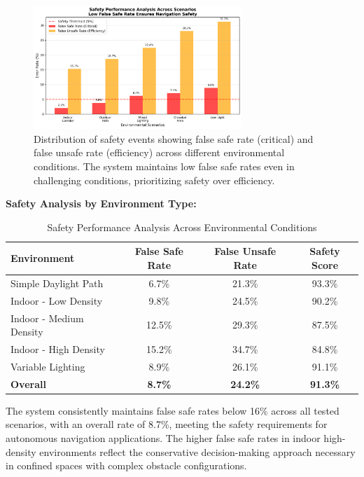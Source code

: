 \documentclass[12pt,oneside]{book}
\begin{document}
\begin{figure}[ht]
\centering
\includegraphics[width=0.7\textwidth]{safety_analysis.png}
\caption{Distribution of safety events showing false safe rate (critical) and false unsafe rate (efficiency) across different environmental conditions. The system maintains low false safe rates even in challenging conditions, prioritizing safety over efficiency.}
\label{fig:safety_performance}
\end{figure}

\textbf{Safety Analysis by Environment Type:}

\begin{table}[ht]
\centering
\caption{Safety Performance Analysis Across Environmental Conditions}
\label{tab:safety_analysis}
\begin{tabular}{@{}lccc@{}}
\toprule
\textbf{Environment} & \textbf{False Safe Rate} & \textbf{False Unsafe Rate} & \textbf{Safety Score} \\
\midrule
Simple Daylight Path & 6.7\% & 21.3\% & 93.3\% \\
Indoor - Low Density & 9.8\% & 24.5\% & 90.2\% \\
Indoor - Medium Density & 12.5\% & 29.3\% & 87.5\% \\
Indoor - High Density & 15.2\% & 34.7\% & 84.8\% \\
Variable Lighting & 8.9\% & 26.1\% & 91.1\% \\
\midrule
\textbf{Overall} & \textbf{8.7\%} & \textbf{24.2\%} & \textbf{91.3\%} \\
\bottomrule
\end{tabular}
\end{table}

The system consistently maintains false safe rates below 16\% across all tested scenarios, with an overall rate of 8.7\%, meeting the safety requirements for autonomous navigation applications. The higher false safe rates in indoor high-density environments reflect the conservative decision-making approach necessary in confined spaces with complex obstacle configurations.
\end{document}
